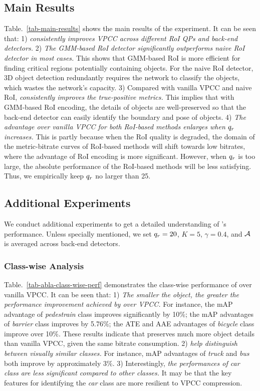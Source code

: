 \subsection{Main Results}
\label{sec-main-results}
Table.~\ref{tab-main-results} shows the main results of the experiment. It can be seen that: 1) \textit{\methodname{} consistently improves VPCC across different RoI QPs and back-end detectors.} 2) \textit{The GMM-based RoI detector significantly outperforms naive RoI detector in most cases.} This shows that GMM-based RoI is more efficient for finding critical regions potentially containing objects. For the naive RoI detector, 3D object detection redundantly requires the network to classify the objects, which wastes the network's capacity. 3)  Compared with vanilla VPCC and naive RoI, \textit{\methodname{} consistently improves the true-positive metrics.} This implies that with GMM-based RoI encoding, the details of objects are well-preserved so that the back-end detector can easily identify the boundary and pose of objects. 4) \textit{The advantage over vanilla VPCC for both RoI-based methods enlarges when ${q_{r}}$ increases.} This is partly because when the RoI quality is degraded, the domain of the metric-bitrate curves of RoI-based methods will shift towards low bitrates, where the advantage of RoI encoding is more significant. However, when ${q_{r}}$ is too large, the absolute performance of the RoI-based methods will be less satisfying. Thus, we empirically keep ${q_{r}}$ no larger than 25.


\subsection{Additional Experiments}
We conduct additional experiments to get a detailed understanding of \methodname{}'s performance. Unless specially mentioned, we set ${q_{r}}=20$, $K=5$, $\gamma=0.4$, and $\mathcal{A}$ is averaged across back-end detectors. 

\vspace{-0.2cm}
\subsubsection{Class-wise Analysis}

Table.~\ref{tab-abla-class-wise-perf} demonstrates the class-wise performance of \methodname{} over vanilla VPCC. It can be seen that: 1) \textit{The smaller the object, the greater the performance improvement achieved by \methodname{} over VPCC.} For instance, the mAP advantage of \textit{pedestrain} class improves significantly by 10\%; the mAP advantages of \textit{barrier} class improves by 5.76\%; the ATE and AAE advantages of \textit{bicycle} class improve over 10\%. These results indicate that \methodname{} preserves much more object details than vanilla VPCC, given the same bitrate consumption. 2) \textit{\methodname{} help distinguish between visually similar classes.} For instance, mAP advantages of \textit{truck} and \textit{bus} both improve by approximately 3\%. 3) Interestingly, \textit{the performances of \textit{car} class are less significant compared to other classes.} It may be that the key features for identifying the \textit{car} class are more resilient to VPCC compression.


